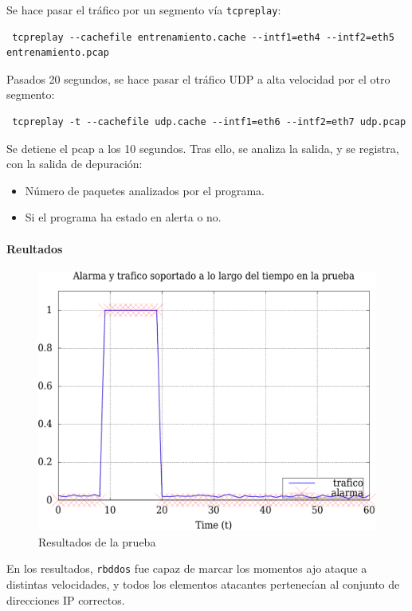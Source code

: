 Se hace pasar el tráfico por un segmento vía \texttt{tcpreplay}:
\begin{verbatim}
 tcpreplay --cachefile entrenamiento.cache --intf1=eth4 --intf2=eth5 entrenamiento.pcap
\end{verbatim}

Pasados 20 segundos, se hace pasar el tráfico UDP a alta velocidad por el otro segmento:
\begin{verbatim}
 tcpreplay -t --cachefile udp.cache --intf1=eth6 --intf2=eth7 udp.pcap
\end{verbatim}

Se detiene el pcap a los 10 segundos. Tras ello, se analiza la salida, y se registra, con la salida de depuración:
\begin{itemize}
 \item Número de paquetes analizados por el programa.
 \item Si el programa ha estado en alerta o no.
\end{itemize}

\paragraph{Reultados}

\begin{figure}[htbp]
\centering
\includegraphics[width=\textwidth]{CapituloPruebas/Figuras/pruebaTrafico-crop}
\caption{Resultados de la prueba}
\end{figure}
%

En los resultados, \texttt{rbddos} fue capaz de marcar los momentos ajo ataque a distintas velocidades, y todos los 
elementos atacantes pertenecían al conjunto de direcciones IP correctos.

